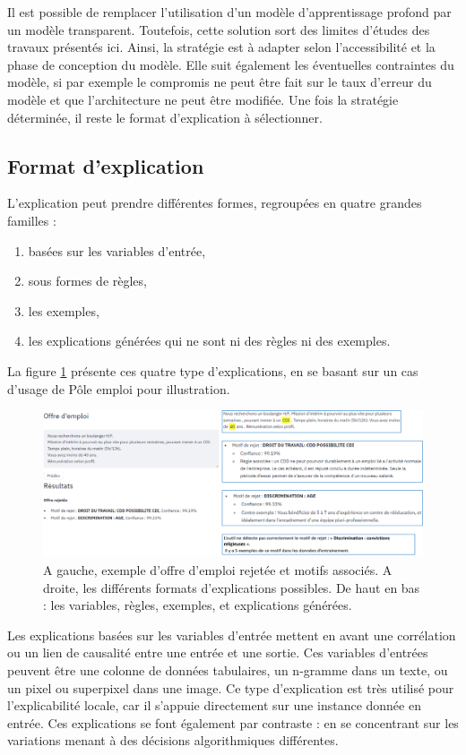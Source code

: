 Il est possible de remplacer l'utilisation d'un modèle d'apprentissage profond par un modèle transparent. Toutefois, cette solution sort des limites d'études des travaux présentés ici.
Ainsi, la stratégie est à adapter selon l'accessibilité et la phase de conception du modèle. Elle suit également les éventuelles contraintes du modèle, si par exemple le compromis ne peut être fait sur le taux d'erreur du modèle et que l'architecture ne peut être modifiée. Une fois la stratégie déterminée, il reste le format d'explication à sélectionner.

\subsection{Format d'explication}


L'explication peut prendre différentes formes, regroupées en quatre grandes familles :
\begin{enumerate}
    \item basées sur les variables d'entrée,
    \item sous formes de règles,
    \item les exemples,
    \item les explications générées qui ne sont ni des règles ni des exemples.
\end{enumerate}

La figure \ref{fig:format_exps} présente ces quatre type d'explications, en se basant sur un cas d'usage de Pôle emploi pour illustration.

\begin{figure}[htpb!]
    \centering
    \includegraphics[scale=0.22]{Introduction/figures/format_explications.png}
    \caption{A gauche, exemple d'offre d'emploi rejetée et motifs associés. A droite, les différents formats d'explications possibles. De haut en bas : les variables, règles, exemples, et explications générées.}
    \label{fig:format_exps}
\end{figure}

Les explications basées sur les variables d'entrée mettent en avant une corrélation ou un lien de causalité entre une entrée et une sortie. Ces variables d'entrées peuvent être une colonne de données tabulaires, un n-gramme dans un texte, ou un pixel ou superpixel dans une image.
Ce type d'explication est très utilisé pour l'explicabilité locale, car il s'appuie directement sur une instance donnée en entrée.
Ces explications se font également par contraste : en se concentrant sur les variations menant à des décisions algorithmiques différentes.

